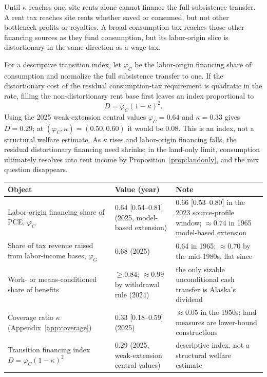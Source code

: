 \documentclass[12pt]{article}
\theoremstyle{plain}
\begin{document}
Until $\kappa$ reaches one, site rents alone cannot finance the full subsistence transfer. A rent tax reaches site rents whether saved or consumed, but not other bottleneck profits or royalties. A broad consumption tax reaches those other financing sources as they fund consumption, but its labor-origin slice is distortionary in the same direction as a wage tax.

For a descriptive transition index, let $\varphi_C$ be the labor-origin financing share of consumption and normalize the full subsistence transfer to one. If the distortionary cost of the residual consumption-tax requirement is quadratic in the rate, filling the non-distortionary rent base first leaves an index proportional to
\[
D=\varphi_C(1-\kappa)^2.
\]
Using the 2025 weak-extension central values $\varphi_C=0.64$ and $\kappa=0.33$ gives $D=0.29$; at $(\varphi_C,\kappa)=(0.50,0.60)$ it would be 0.08. This is an index, not a structural welfare estimate. As $\kappa$ rises and labor-origin financing falls, the residual distortionary financing need shrinks; in the land-only limit, consumption ultimately resolves into rent income by Proposition~\ref{prop:landonly}, and the mix question disappears.

\begin{center}
{\small
\begin{tabular}{p{5.4cm} p{3.5cm} p{4.8cm}}
\toprule
Object & Value (year) & Note \\
\midrule
Labor-origin financing share of PCE, $\varphi_C$ & 0.64 [0.54--0.81] (2025, model-based extension) & 0.66 [0.53--0.80] in the 2023 source-profile window; $\approx 0.74$ in 1965 model-based extension \\
Share of tax revenue raised from labor-income bases, $\varphi_G$ & 0.68 (2025) & 0.64 in 1965; $\approx 0.70$ by the mid-1980s, flat since \\
Work- or means-conditioned share of benefits & $\ge 0.84$; $\approx 0.99$ by withdrawal rule (2024) & the only sizable unconditional cash transfer is Alaska's dividend \\
Coverage ratio $\kappa$ (Appendix~\ref{app:coverage}) & 0.33 [0.18--0.59] (2025) & $\approx 0.05$ in the 1950s; land measures are lower-bound constructions \\
Transition financing index $D=\varphi_C(1-\kappa)^2$ & 0.29 (2025, weak-extension central values) & descriptive index, not a structural welfare estimate \\
\bottomrule
\end{tabular}
}
\end{center}
\end{document}
